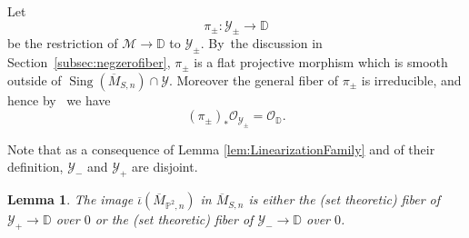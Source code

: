 \documentclass[11pt]{article}
\newcommand{\DD}{{\mathbb D}}
\newcommand{\PP}{{\mathbb P}}\let\P\PP
\newcommand\cM{\mathcal{M}}
\newcommand\cO{\mathcal{O}}
\newcommand\cY{\mathcal{Y}}
\DeclareMathOperator{\Sing}{Sing}
\let\ov\overline
\newtheorem{lemm}{Lemma}[section]
\theoremstyle{definition}
\def\citestacks#1{\cite[\href{https://stacks.math.columbia.edu/tag/#1}{Tag #1}]{stacks-project}}
\begin{document}
Let
\begin{equation}\label{eq:FixedFamilyFlat}
\pi_{\pm}\colon \cY_{\pm} \to \DD
\end{equation}
be the restriction of $\cM\to\DD$ to $\cY_{\pm}$. By~the discussion in Section~\ref{subsec:negzerofiber}, $\pi_{\pm}$ is a flat projective morphism which is smooth outside of $\Sing(\overline{M}_{S,n})\cap \cY$.
Moreover the general fiber of $\pi_{\pm}$ is irreducible, and hence by~\citestacks{0AY8} we have
\begin{equation}\label{pushstruct}
\left(\pi_{\pm}\right)_*\cO_{\cY_{\pm}}=\cO_{\DD}.
\end{equation}

Note that as a consequence of Lemma \ref{lem:LinearizationFamily} and of their definition, $\cY_-$ and $\cY_+$ are disjoint.

\begin{lemm}\label{lem:tuttasola}
The image $\ov{\iota}(\ov{M}_{\PP^2,n})$ in $\ov{M}_{S,n}$ is either the (set theoretic) fiber of \hbox{$\cY_+\to \DD$} over $0$ or the (set theoretic) fiber of $\cY_-\to \DD$ over $0$.
\end{lemm}
\end{document}
